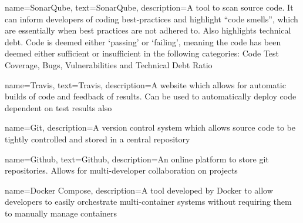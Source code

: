 {
    name={SonarQube},
    text={SonarQube},
    description={A tool to scan source code. It can inform developers of coding best-practices and highlight ``code smells'', which are essentially when best practices are not adhered to. Also highlights technical debt. Code is deemed either `passing' or `failing', meaning the code has been deemed either sufficient or insufficient in the following categories: Code Test Coverage, Bugs, Vulnerabilities and Technical Debt Ratio}
}

{
    name={Travis},
    text={Travis},
    description={A website which allows for automatic builds of code and feedback of results. Can be used to automatically deploy code dependent on test results also}
}

{
    name={Git},
    description={A version control system which allows source code to be tightly controlled and stored in a central repository}
}

{
    name={Github},
    text={Github},
    description={An online platform to store git repositories. Allows for multi-developer collaboration on projects}
}

{
    name={Docker Compose},
    description={A tool developed by Docker to allow developers to easily orchestrate multi-container systems without requiring them to manually manage containers}
}
